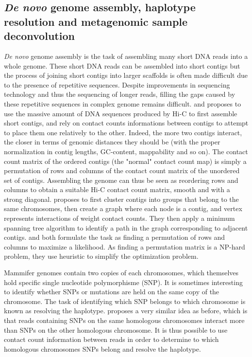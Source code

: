 \subsection{\textit{De novo} genome assembly, haplotype resolution and
metagenomic sample deconvolution}

\textit{De novo} genome assembly is the task of assembling many short DNA
reads into a whole genome. These short DNA reads can be assembled into short
contigs but the process of joining short contigs into larger scaffolds is
often made difficult due to the presence of repetitive sequences. Despite
improvements in sequencing technology and thus the sequencing of longer reads,
filling the gaps caused by these repetitive sequences in complex genome
remains difficult. \citet{burton:chromosome} and
\citet{kaplan:high-throughput} proposes to use the massive amount of DNA
sequences produced by Hi-C to first assemble short contigs, and rely on
contact counts informations between contigs to attempt to place them one
relatively to the other. Indeed, the more two contigs interact, the closer in
terms of genomic distances they should be (with the proper normalization in
contig lengths, GC-content, mappability and so on). The contact count matrix
of the ordered contigs (the "normal" contact count map) is simply a
permutation of rows and columns of the contact count matrix of the unordered
set of contigs. Assembling the genome can thus be seen as reordering rows and
columns to obtain a suitable Hi-C contact count matrix, smooth and with a
strong diagonal. \citet{burton:chromosome} proposes to first cluster contigs
into groups that belong to the same chromosomes, then create a graph where
each node is a contig, and vertex represents interactions of weight contact
counts. They then apply a minimum spanning tree algorithm to identify a path
in the graph corresponding to adjacent contigs. \citet{kaplan:high-throughput}
and \citet{marie-nelly:high-quality} both formulate the task as finding a
permutation of rows and columns to maximize a likelihood. As finding a
permutation matrix is a NP-hard problem, they use heuristic to simplify the
optimization problem.

Mammifer genomes contain two copies of each chromosomes, which themselves hold
specific single nucleotide polymorphisme (SNP). It is sometimes interesting to
identify whether SNPs or mutations are held on the same copy of the
chromosome. The task of identifying which SNP belongs to which chromosome is
known as resolving the haplotype. \citet{selvaraj:whole-genome}
proposes a very similar idea as
before, which is that reads containing SNPs on the same homologous chromosomes
interact more than SNPs on the other homologous chromosome. It is thus
possible to use contact count information between reads in order to determine
to which homologous chromosomes SNPs belong and resolve the haplotype.

